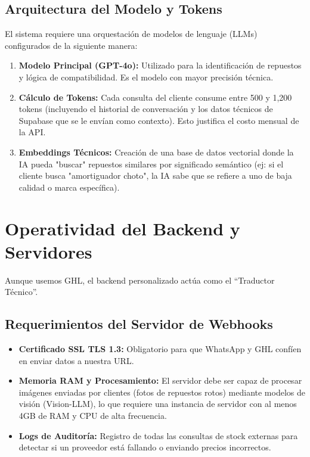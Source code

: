 \documentclass[12pt,a4paper]{article}
\begin{document}
\subsection{Arquitectura del Modelo y Tokens}
El sistema requiere una orquestación de modelos de lenguaje (LLMs) configurados de la siguiente manera:
\begin{enumerate}
    \item \textbf{Modelo Principal (GPT-4o):} Utilizado para la identificación de repuestos y lógica de compatibilidad. Es el modelo con mayor precisi\'on t\'ecnica.
    \item \textbf{Cálculo de Tokens:} Cada consulta del cliente consume entre 500 y 1,200 tokens (incluyendo el historial de conversación y los datos t\'ecnicos de Supabase que se le envían como contexto). Esto justifica el costo mensual de la API.
    \item \textbf{Embeddings Técnicos:} Creación de una base de datos vectorial donde la IA pueda "buscar" repuestos similares por significado semántico (ej: si el cliente busca "amortiguador choto", la IA sabe que se refiere a uno de baja calidad o marca específica).
\end{enumerate}

\section{Operatividad del Backend y Servidores}
Aunque usemos GHL, el backend personalizado actúa como el ``Traductor Técnico''.

\subsection{Requerimientos del Servidor de Webhooks}
\begin{itemize}
    \item \textbf{Certificado SSL TLS 1.3:} Obligatorio para que WhatsApp y GHL confíen en enviar datos a nuestra URL.
    \item \textbf{Memoria RAM y Procesamiento:} El servidor debe ser capaz de procesar imágenes enviadas por clientes (fotos de repuestos rotos) mediante modelos de visión (Vision-LLM), lo que requiere una instancia de servidor con al menos 4GB de RAM y CPU de alta frecuencia.
    \item \textbf{Logs de Auditoría:} Registro de todas las consultas de stock externas para detectar si un proveedor est\'a fallando o enviando precios incorrectos.
\end{itemize}
\end{document}
